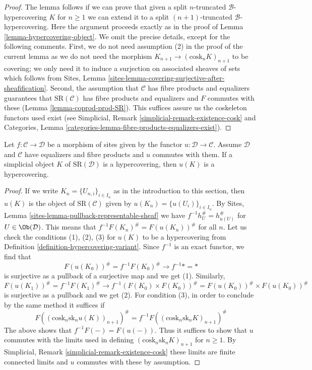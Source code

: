 \begin{proof}
\medskip\noindent
The lemma follows if we can prove that given a split
$n$-truncated $\mathcal{B}$-hypercovering $K$ for $n \geq 1$
we can extend it to a split $(n + 1)$-truncated $\mathcal{B}$-hypercovering.
Here the argument proceeds exactly as in the proof of
Lemma \ref{lemma-hypercovering-object}.
We omit the precise details, except for the following comments.
First, we do not need assumption (2) in the proof of the current
lemma as we do not need the morphism
$K_{n + 1} \to (\text{cosk}_n K)_{n + 1}$ to be covering;
we only need it to induce a surjection on associated sheaves of sets
which follows from
Sites, Lemma \ref{sites-lemma-covering-surjective-after-sheafification}.
Second, the assumption that $\mathcal{C}$ has fibre products and equalizers
guarantees that $\text{SR}(\mathcal{C})$ has fibre products
and equalizers and $F$ commutes with these
(Lemma \ref{lemma-coprod-prod-SR}). This suffices
assure us the coskeleton functors used exist (see
Simplicial, Remark \ref{simplicial-remark-existence-cosk} and
Categories, Lemma \ref{categories-lemma-fibre-products-equalizers-exist}).
\end{proof}

\begin{lemma}
\label{lemma-hypercovering-morphism-sites}
Let $f : \mathcal{C} \to \mathcal{D}$ be a morphism of sites
given by the functor $u : \mathcal{D} \to \mathcal{C}$.
Assume $\mathcal{D}$ and $\mathcal{C}$ have equalizers and
fibre products and $u$ commutes with them.
If a simplicial object $K$ of $\text{SR}(\mathcal{D})$
is a hypercovering, then $u(K)$ is a hypercovering.
\end{lemma}

\begin{proof}
If we write $K_n = \{U_{n, i}\}_{i \in I_n}$ as in the introduction
to this section, then $u(K)$ is the object of $\text{SR}(\mathcal{C})$
given by $u(K_n) = \{u(U_i)\}_{i \in I_n}$.
By Sites, Lemma \ref{sites-lemma-pullback-representable-sheaf}
we have $f^{-1}h_U^\# = h_{u(U)}^\#$ for $U \in \Ob(\mathcal{D})$.
This means that $f^{-1}F(K_n)^\# = F(u(K_n))^\#$ for all $n$.
Let us check the conditions (1), (2), (3) for $u(K)$ to be a
hypercovering from Definition \ref{definition-hypercovering-variant}.
Since $f^{-1}$ is an exact functor, we find that
$$
F(u(K_0))^\# = f^{-1}F(K_0)^\# \to f^{-1}* = *
$$
is surjective as a pullback of a surjective map and we get (1).
Similarly,
$$
F(u(K_1))^\# = f^{-1}F(K_1)^\# \to
f^{-1} (F(K_0) \times F(K_0))^\# = F(u(K_0))^\# \times F(u(K_0))^\#
$$
is surjective as a pullback and we get (2). For condition (3),
in order to conclude by the same method it suffices if
$$
F((\text{cosk}_n \text{sk}_n u(K))_{n + 1})^\# =
f^{-1}F((\text{cosk}_n \text{sk}_n K)_{n + 1})^\#
$$
The above shows that $f^{-1}F(-) = F(u(-))$. Thus it suffices to show
that $u$ commutes with the limits used in defining
$(\text{cosk}_n \text{sk}_n K)_{n + 1}$ for $n \geq 1$.
By Simplicial, Remark \ref{simplicial-remark-existence-cosk}
these limits are finite connected limits and $u$ commutes with these
by assumption.
\end{proof}


